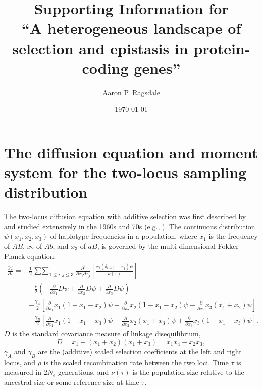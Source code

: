\documentclass[]{article}
\begin{document}
\title{Supporting Information for\\
``A heterogeneous landscape of selection and epistasis in protein-coding genes''}
\author[]{Aaron P. Ragsdale}
\date{\today}
\maketitle

\renewcommand{\thefigure}{S\arabic{figure}}
\renewcommand{\thetable}{S\arabic{table}}
\renewcommand{\theequation}{S\arabic{equation}}
\setcounter{figure}{0}
\setcounter{table}{0}
\setcounter{equation}{0}

\small
\tableofcontents
\normalsize
\newpage

\clearpage

\section{The diffusion equation and moment system for the two-locus sampling distribution}

The two-locus diffusion equation with additive selection was first described by
\citet{Kimura1955-qe} and studied extensively in the 1960s and 70s (e.g.,
\citet{Hill1966-gv,Ohta1969-ie}). The continuous distribution \(\psi(x_1, x_2,
x_3)\) of haplotype frequencies in a population, where \(x_1\) is the frequency
of \(AB\), \(x_2\) of \(Ab\), and \(x_3\) of \(aB\), is governed by the
multi-dimensional Fokker-Planck equation:
\begin{align} \label{eq:diffeq}
\frac{\partial \psi}{\partial \tau} = &
\frac{1}{2}\mathop{\sum\sum}_{1\leq i, j \leq 3}
\frac{\partial^2}{\partial x_i \partial x_j}
\left[\frac{x_i(\delta_{i=j}-x_j)\psi}{\nu(\tau)}\right] \\\nonumber
& -\frac{\rho}{2}\left(-\frac{\partial}{\partial x_1} D\psi
  + \frac{\partial}{\partial x_2} D\psi
  + \frac{\partial}{\partial x_3} D\psi\right) \\\nonumber
& - \frac{\gamma_A}{2}\left[
  \frac{\partial}{\partial x_1} x_1(1-x_1-x_2)\psi
  + \frac{\partial}{\partial x_2} x_2(1-x_1-x_2)\psi
  - \frac{\partial}{\partial x_3} x_3(x_1+x_2)\psi
  \right] \\\nonumber
& -\frac{\gamma_B}{2}\left[
  \frac{\partial}{\partial x_1} x_1(1-x_1-x_3)\psi
  - \frac{\partial}{\partial x_2} x_2(x_1+x_3)\psi
  + \frac{\partial}{\partial x_3} x_3(1-x_1-x_3)\psi
  \right].
\end{align}
\(D\) is the standard covariance measure of linkage disequilibrium, \[D=x_1 -
(x_1+x_2)(x_1+x_3) = x_1 x_4 - x_2 x_3,\] \(\gamma_A\) and \(\gamma_B\) are the
(additive) scaled selection coefficients at the left and right locus, and
\(\rho\) is the scaled recombination rate between the two loci. Time \(\tau\) is
measured in \(2N_e\) generations, and \(\nu(\tau)\) is the population size relative
to the ancestral size or some reference size at time \(\tau\).
\end{document}
